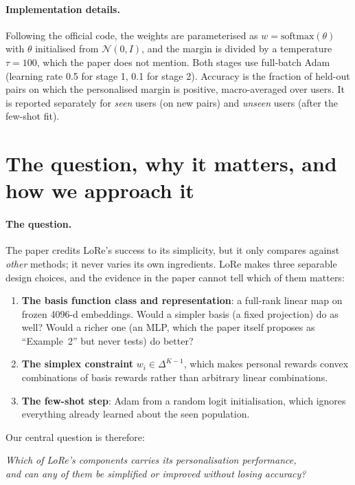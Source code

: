 \documentclass[11pt,a4paper]{article}
\newcommand{\simplex}{\Delta^{K-1}}
\begin{document}
\paragraph{Implementation details.} Following the official code, the weights are parameterised as
$w=\mathrm{softmax}(\theta)$ with $\theta$ initialised from $\mathcal{N}(0,I)$, and the margin is divided by
a temperature $\tau=100$, which the paper does not mention. Both stages use full-batch Adam (learning
rate 0.5 for stage 1, 0.1 for stage 2). Accuracy is the fraction of held-out pairs on which the
personalised margin is positive, macro-averaged over users. It is reported separately for \emph{seen}
users (on new pairs) and \emph{unseen} users (after the few-shot fit).

\section{The question, why it matters, and how we approach it}
\label{sec:question}

\paragraph{The question.} The paper credits LoRe's success to its simplicity, but it only compares
against \emph{other} methods; it never varies its own ingredients. LoRe makes three separable design
choices, and the evidence in the paper cannot tell which of them matters:
\begin{enumerate}[label=\textbf{(\arabic*)}]
\item \textbf{The basis function class and representation}: a full-rank linear map on frozen 4096-d
embeddings. Would a simpler basis (a fixed projection) do as well? Would a richer one (an MLP, which
the paper itself proposes as ``Example~2'' but never tests) do better?
\item \textbf{The simplex constraint} $w_i\in\simplex$, which makes personal rewards convex combinations
of basis rewards rather than arbitrary linear combinations.
\item \textbf{The few-shot step}: Adam from a random logit initialisation, which ignores everything
already learned about the seen population.
\end{enumerate}
Our central question is therefore:
\begin{center}
\emph{Which of LoRe's components carries its personalisation performance,\\
and can any of them be simplified or improved without losing accuracy?}
\end{center}
\end{document}
